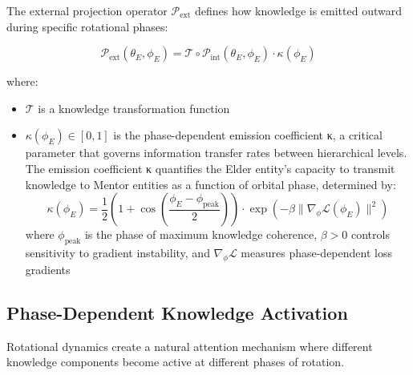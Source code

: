 \begin{definition}
The external projection operator $\mathcal{P}_{\text{ext}}$ defines how knowledge is emitted outward during specific rotational phases:

\begin{equation}
\mathcal{P}_{\text{ext}}(\theta_E, \phi_E) = \mathcal{T} \circ \mathcal{P}_{\text{int}}(\theta_E, \phi_E) \cdot \kappa(\phi_E)
\end{equation}

where:
\begin{itemize}
    \item $\mathcal{T}$ is a knowledge transformation function
    \item $\kappa(\phi_E) \in [0,1]$ is the phase-dependent emission coefficient κ, a critical parameter that governs information transfer rates between hierarchical levels. The emission coefficient κ quantifies the Elder entity's capacity to transmit knowledge to Mentor entities as a function of orbital phase, determined by:
    \begin{equation}
    \kappa(\phi_E) = \frac{1}{2}\left(1 + \cos\left(\frac{\phi_E - \phi_{\text{peak}}}{2}\right)\right) \cdot \exp\left(-\beta \|\nabla_{\phi} \mathcal{L}(\phi_E)\|^2\right)
    \end{equation}
    where $\phi_{\text{peak}}$ is the phase of maximum knowledge coherence, $\beta > 0$ controls sensitivity to gradient instability, and $\nabla_{\phi} \mathcal{L}$ measures phase-dependent loss gradients
\end{itemize}
\end{definition}

\subsection{Phase-Dependent Knowledge Activation}

Rotational dynamics create a natural attention mechanism where different knowledge components become active at different phases of rotation.

